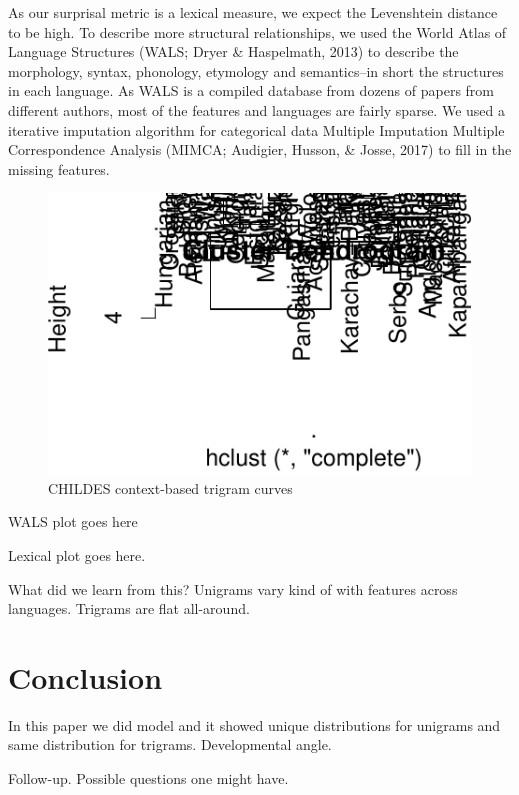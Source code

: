 \documentclass[10pt, letterpaper]{article}
\newenvironment{CodeChunk}{}{}
\begin{document}
As our surprisal metric is a lexical measure, we expect the Levenshtein
distance to be high. To describe more structural relationships, we used
the World Atlas of Language Structures (WALS; Dryer \& Haspelmath, 2013)
to describe the morphology, syntax, phonology, etymology and
semantics--in short the structures in each language. As WALS is a
compiled database from dozens of papers from different authors, most of
the features and languages are fairly sparse. We used a iterative
imputation algorithm for categorical data Multiple Imputation Multiple
Correspondence Analysis (MIMCA; Audigier, Husson, \& Josse, 2017) to
fill in the missing features.

\begin{CodeChunk}
\begin{figure}[tb]
\includegraphics{figs/dendro-1} \caption[CHILDES context-based trigram curves]{CHILDES context-based trigram curves}\label{fig:dendro}
\end{figure}
\end{CodeChunk}

WALS plot goes here

Lexical plot goes here.

What did we learn from this? Unigrams vary kind of with features across
languages. Trigrams are flat all-around.

\hypertarget{conclusion}{%
\section{Conclusion}\label{conclusion}}

In this paper we did model and it showed unique distributions for
unigrams and same distribution for trigrams. Developmental angle.

Follow-up. Possible questions one might have.
\end{document}
